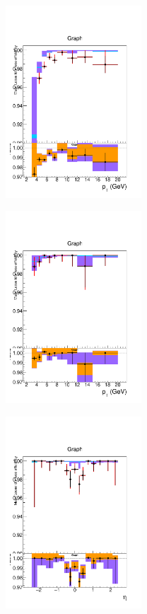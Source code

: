 \begin{figure}[tbh]
\centering
\begin{subfigure}{0.3\textwidth}
\centering
\includegraphics[width=2in]{Figures/Muons/mu_Loose_barrel.pdf}
\caption{}
\end{subfigure}
\begin{subfigure}{0.3\textwidth}
\centering
\includegraphics[width=2in]{Figures/Muons/mu_Loose_endcap.pdf}
\caption{}
\end{subfigure}
\begin{subfigure}{0.3\textwidth}
\centering
\includegraphics[width=2in]{Figures/Muons/mu_Loose_pt7.pdf}

\end{subfigure}
\end{figure}
